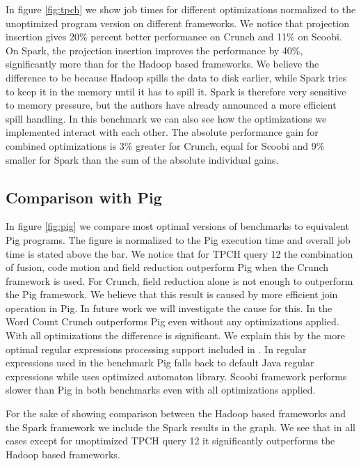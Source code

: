 In figure \ref{fig:tpch} we show job times for different optimizations normalized to the unoptimized program version on different frameworks. We notice that projection insertion gives 20\% percent better performance on Crunch and 11\% on Scoobi. On Spark, the projection insertion improves the performance by 40\%, significantly more than for the Hadoop based frameworks. We believe the difference to be because Hadoop spills the data to disk earlier, while Spark tries to keep it in the memory until it has to spill it. Spark is therefore very sensitive to memory pressure, but the authors have already announced a more efficient spill handling.
In this benchmark we can also see how the optimizations we implemented interact with each other. The absolute performance gain for combined optimizations is 3\% greater for Crunch, equal for Scoobi and 9\% smaller for Spark than the sum of the absolute individual gains.

\subsection{Comparison with Pig}
\label{subsec:pig}

In figure \ref{fig:pig} we compare most optimal versions of benchmarks to equivalent Pig programs. The figure is normalized to the Pig execution time and overall job time is stated above the bar. We notice that for TPCH query 12 the combination of fusion, code motion and field reduction outperform Pig when the Crunch framework is used. 
For Crunch, field reduction alone is not enough to outperform the Pig framework. We believe that this result is caused by more efficient join operation in Pig. In future work we will investigate the cause for this.
In the Word Count Crunch outperforms Pig even without any optimizations applied. With all optimizations the difference is significant. We explain this by the more optimal regular expressions processing support included in \tool. In regular expressions used in the benchmark Pig falls back to default Java regular expressions while \tool uses optimized automaton library. Scoobi framework performs slower than Pig in both benchmarks even with all optimizations applied.

For the sake of showing comparison between the Hadoop based frameworks and the Spark framework we include the Spark results in the graph. We see that in all cases except for unoptimized TPCH query 12 it significantly outperforms the Hadoop based frameworks.

